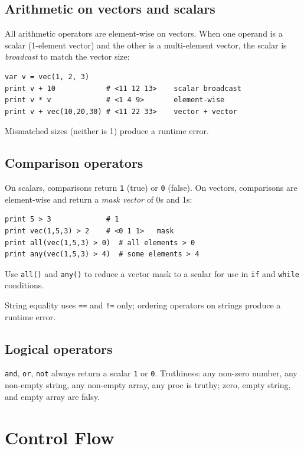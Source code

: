 \documentclass[11pt,a4paper]{article}
\newcommand{\musil}[1]{\lstinline[style=musilinline]{#1}}
\begin{document}
\subsection{Arithmetic on vectors and scalars}

All arithmetic operators are element-wise on vectors. When one operand is a
scalar (1-element vector) and the other is a multi-element vector, the scalar is
\emph{broadcast} to match the vector size:

\begin{lstlisting}
var v = vec(1, 2, 3)
print v + 10            # <11 12 13>    scalar broadcast
print v * v             # <1 4 9>       element-wise
print v + vec(10,20,30) # <11 22 33>    vector + vector
\end{lstlisting}

Mismatched sizes (neither is 1) produce a runtime error.

\subsection{Comparison operators}

On scalars, comparisons return \texttt{1} (true) or \texttt{0} (false).
On vectors, comparisons are element-wise and return a \emph{mask vector} of
0s and 1s:

\begin{lstlisting}
print 5 > 3             # 1
print vec(1,5,3) > 2    # <0 1 1>   mask
print all(vec(1,5,3) > 0)  # all elements > 0
print any(vec(1,5,3) > 4)  # some elements > 4
\end{lstlisting}

Use \musil{all()} and \musil{any()} to reduce a vector mask to a scalar for
use in \musil{if} and \musil{while} conditions.

String equality uses \musil{==} and \musil{!=} only; ordering operators on strings
produce a runtime error.

\subsection{Logical operators}

\musil{and}, \musil{or}, \musil{not} always return a scalar \texttt{1} or \texttt{0}.
Truthiness: any non-zero number, any non-empty string, any non-empty array, any
proc is truthy; zero, empty string, and empty array are falsy.

\section{Control Flow}
\label{sec:control}
\end{document}
